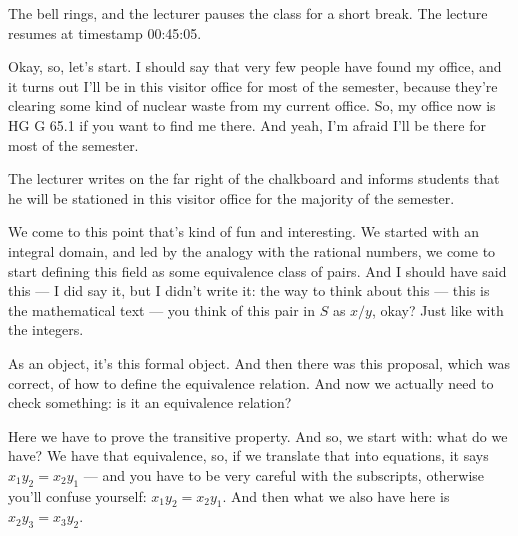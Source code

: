 \begin{pause}
The bell rings, and the lecturer pauses the class for a short break. The lecture resumes at timestamp 00:45:05.
\end{pause}

\begin{speech}[00:45:05 - 00:45:33]
Okay, so, let's start. I should say that very few people have found my office, and it turns out I'll be in this visitor office for most of the semester, because they're clearing some kind of nuclear waste from my current office. So, my office now is HG G 65.1  if you want to find me there. And yeah, I'm afraid I'll be there for most of the semester.
\end{speech}

\begin{note}
The lecturer writes  on the far right of the chalkboard and informs students that he will be stationed in this visitor office for the majority of the semester.
\end{note}

\begin{speech}[00:45:33 - 00:47:00]
We come to this point that's kind of fun and interesting. We started with an integral domain, and led by the analogy with the rational numbers, we come to start defining this field as some equivalence class of pairs. And I should have said this --- I did say it, but I didn't write it: the way to think about this  --- this is the mathematical text --- you think of this pair in $S$ as $x/y$, okay? Just like with the integers.

As an object, it's this formal object. And then there was this proposal, which was correct, of how to define the equivalence relation. And now we actually need to check something: is it an equivalence relation?

Here we have to prove the transitive property. And so, we start with: what do we have? We have that equivalence, so, if we translate that into equations, it says $x_1 y_2 = x_2 y_1$ --- and you have to be very careful with the subscripts, otherwise you'll confuse yourself:  $x_1 y_2 = x_2 y_1$. And then what we also have here is $x_2 y_3 = x_3 y_2$. 
\end{speech}

